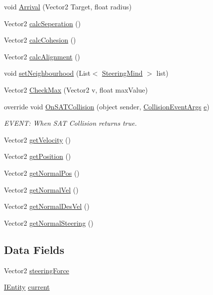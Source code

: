 \begin{DoxyCompactItemize}
void \hyperlink{a00346_a9e29641a665b426ba24b22282b5a4afb}{Arrival} (Vector2 Target, float radius)
\item 
Vector2 \hyperlink{a00346_a49d9a3d4beda2bfaffac447989b9c7b8}{calc\+Seperation} ()
\item 
Vector2 \hyperlink{a00346_a249ef5693985389b6c3e36bbc6a5b905}{calc\+Cohesion} ()
\item 
Vector2 \hyperlink{a00346_aeb7e79e42213d164fbf46bff97dc3b26}{calc\+Alignment} ()
\item 
void \hyperlink{a00346_ac9f9147dba78c35e082b00463696e846}{set\+Neighbourhood} (List$<$ \hyperlink{a00346}{Steering\+Mind} $>$ list)
\item 
Vector2 \hyperlink{a00346_a3006887440eba9edfd5e97bc56febca1}{Check\+Max} (Vector2 v, float max\+Value)
\item 
override void \hyperlink{a00346_a4834c17e78fd0bf82940ca0a4e8966f9}{On\+S\+A\+T\+Collision} (object sender, \hyperlink{a00350}{Collision\+Event\+Args} \hyperlink{a00318_ad89c9691d6b32053fe8ffcdeb68bdacf}{e})
\begin{DoxyCompactList}\small\item\em E\+V\+E\+NT\+: When S\+AT Collision returns true. \end{DoxyCompactList}\item 
Vector2 \hyperlink{a00346_a38152ad6c1dd536187718723061311e4}{get\+Velocity} ()
\item 
Vector2 \hyperlink{a00346_a5ba51a02c0ff7cebadee5c7b18eba5a7}{get\+Position} ()
\item 
Vector2 \hyperlink{a00346_a70f1b35eccd31d3efe3ec7266c77d7c5}{get\+Normal\+Pos} ()
\item 
Vector2 \hyperlink{a00346_a3193d5ceb8a7f78b21d4ff24977e442e}{get\+Normal\+Vel} ()
\item 
Vector2 \hyperlink{a00346_a7828d8105c471ce2e6e134344ad2e379}{get\+Normal\+Des\+Vel} ()
\item 
Vector2 \hyperlink{a00346_a32beb8852d356c29b1d1bf91cce908e5}{get\+Normal\+Steering} ()
\end{DoxyCompactItemize}
\subsection*{Data Fields}
\begin{DoxyCompactItemize}
\item 
Vector2 \hyperlink{a00346_a204d03e4db979c7fd987cd17c09cc15c}{steering\+Force}
\item 
\hyperlink{a00438}{I\+Entity} \hyperlink{a00346_ab7696a602bd19d445ee35f6df2572fcb}{current}
\end{DoxyCompactItemize}
